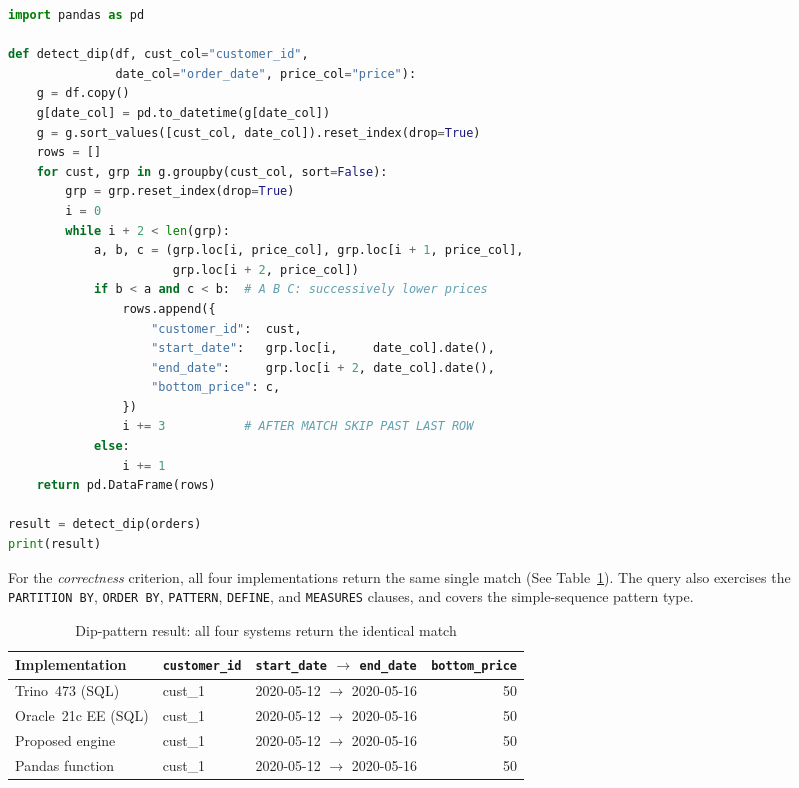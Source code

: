 \begin{lstlisting}[float=htbp,language=Python,
  caption={[Equivalent dip detection in Pandas]Hand-written Pandas function for the same `dip' detection.},
  label={lst:orders-udf}]
import pandas as pd

def detect_dip(df, cust_col="customer_id",
               date_col="order_date", price_col="price"):
    g = df.copy()
    g[date_col] = pd.to_datetime(g[date_col])
    g = g.sort_values([cust_col, date_col]).reset_index(drop=True)
    rows = []
    for cust, grp in g.groupby(cust_col, sort=False):
        grp = grp.reset_index(drop=True)
        i = 0
        while i + 2 < len(grp):
            a, b, c = (grp.loc[i, price_col], grp.loc[i + 1, price_col],
                       grp.loc[i + 2, price_col])
            if b < a and c < b:  # A B C: successively lower prices
                rows.append({
                    "customer_id":  cust,
                    "start_date":   grp.loc[i,     date_col].date(),
                    "end_date":     grp.loc[i + 2, date_col].date(),
                    "bottom_price": c,
                })
                i += 3           # AFTER MATCH SKIP PAST LAST ROW
            else:
                i += 1
    return pd.DataFrame(rows)

result = detect_dip(orders)
print(result)
\end{lstlisting}

For the \emph{correctness} criterion, all four implementations return the
same single match (See Table~\ref{tab:sql-match-recognize-examples}).  The
query also exercises
the \texttt{PARTITION~BY}, \texttt{ORDER~BY}, \texttt{PATTERN},
\texttt{DEFINE}, and \texttt{MEASURES} clauses, and covers the
simple-sequence pattern type.

\begin{table}[H]
\centering
\caption[Dip-pattern result]{Dip-pattern result: all four systems return the identical
  match}
\label{tab:sql-match-recognize-examples}
{\small
\begin{tabular}{lllr}
\toprule
\textbf{Implementation} & \texttt{customer\_id} & \texttt{start\_date} $\rightarrow$ \texttt{end\_date} & \texttt{bottom\_price} \\
\midrule
Trino~473 (SQL)             & cust\_1 & 2020-05-12 $\rightarrow$ 2020-05-16 & 50 \\
Oracle~21c EE (SQL)         & cust\_1 & 2020-05-12 $\rightarrow$ 2020-05-16 & 50 \\
Proposed engine            & cust\_1 & 2020-05-12 $\rightarrow$ 2020-05-16 & 50 \\
Pandas function            & cust\_1 & 2020-05-12 $\rightarrow$ 2020-05-16 & 50 \\
\bottomrule
\end{tabular}
}
\par{}
\end{table}

